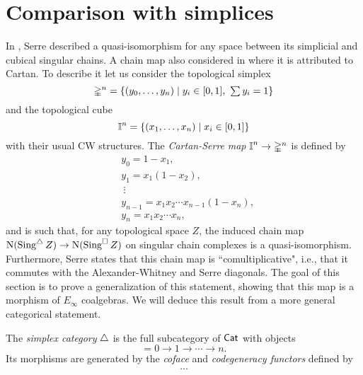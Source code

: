 
\section{Comparison with simplices}

In \cite[p. 442]{Serre1951homologie}, Serre described a quasi-isomorphism for any space between its simplicial and cubical singular chains. A chain map also considered in \cite[p.199]{Eilenberg1953acyclic} where it is attributed to Cartan.
To describe it let us consider the topological simplex
\begin{equation*}
\mathbb{\Delta}^n = \{(y_0, \dots, y_n) \mid y_i \in [0,1], \ \textstyle{\sum} \, y_i = 1\}
\end{equation*}
and the topological cube
\begin{equation*}
\bm{\mathbb{I}}^{n} = \{(x_1, \dots, x_n) \mid x_i \in [0,1]\}
\end{equation*}
with their usual CW structures.
The \textit{Cartan-Serre} \textit{map} $\bm{\mathbb{I}}^n \to \mathbb{\Delta}^n$ is defined by
\begin{equation} \label{e:cartan-serre CW map}
\begin{split}
&y_0 = 1 - x_1, \\
&y_1 = x_1(1 - x_2), \\
&\ \vdots \\
&y_{n-1} = x_1 x_2 \cdots x_{n-1}(1-x_n), \\
&y_{n} = x_1 x_2 \cdots x_n,
\end{split}
\end{equation}
and is such that, for any topological space $Z$, the induced chain map $\operatorname{N}(\operatorname{Sing}^{\triangle} Z) \to \operatorname{N}(\operatorname{Sing}^{\square} Z)$ on singular chain complexes is a quasi-isomorphism.
Furthermore, Serre states that this chain map is ``comultiplicative", i.e., that it commutes with the Alexander-Whitney and Serre diagonals.
The goal of this section is to prove a generalization of this statement, showing that this map is a morphism of $E_\infty$ coalgebras.
We will deduce this result from a more general categorical statement.

The \textit{simplex category} $\triangle$ is the full subcategory of $\mathsf{Cat}$ with objects
\begin{equation*}
[n] = 0 \to 1 \to \cdots \to n.
\end{equation*}
Its morphisms are generated by the \textit{coface} and \textit{codegeneracy functors} defined by
\begin{align*}
...
\end{align*}

